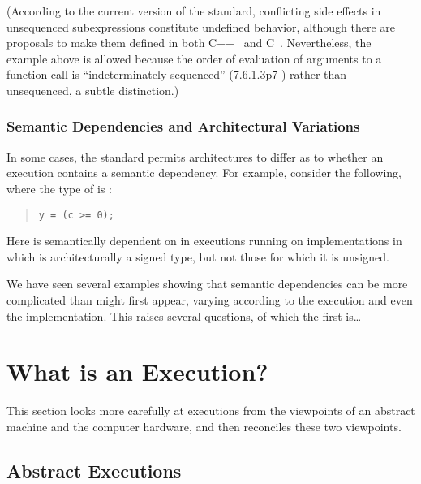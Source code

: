 (According to the current version of the standard, conflicting side effects
in unsequenced subexpressions constitute undefined behavior,
although there are proposals to make them defined in both
C++~\cite{GabrielDosReis2016P0145r3}
and C~\cite{AlexCeleste2023N3203}.
Nevertheless, the example above is allowed because the order of evaluation
of arguments to a function call is ``indeterminately sequenced''
(7.6.1.3p7 ) rather than unsequenced, a subtle distinction.)

\subsubsection{Semantic Dependencies and Architectural Variations}
\label{sec:Semantic Dependencies and Architectural Variations}

In some cases, the standard permits architectures to differ as to whether
an execution contains a semantic dependency.
For example, consider the following, where the type of  is :
\begin{quote}
\begin{verbatim}
y = (c >= 0);
\end{verbatim}
\end{quote}
Here  is semantically dependent on  in executions
running on implementations in
which  is architecturally a signed type,
but not those for which it is unsigned.

\medskip

We have seen several examples showing that semantic dependencies can
be more complicated than might first appear, varying according to the
execution and even the implementation.
This raises several questions, of which the first is\dots

\section{What is an Execution?}
\label{sec:What is an Execution?}

This section looks more carefully at executions from the viewpoints of
an abstract machine and the computer hardware, and then reconciles
these two viewpoints.

\subsection{Abstract Executions}
\label{sec:Abstract Executions}

